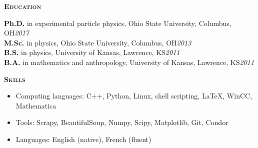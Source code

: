 \documentclass[line]{letter}
\begin{document}
{\vspace{3pt}\Large \textsc{\textbf{Education}}}%
\begin{addmargin}[1em]{1em}
{\bf \large Ph.D.} in experimental particle physics, Ohio State University, Columbus, OH\hfill {\large \it 2017}\vspace{1mm}\\
{\bf \large M.Sc.} in physics, Ohio State University, Columbus, OH\hfill {\large \it 2013}\vspace{1mm}\\
{\bf \large B.S.} in physics, University of Kansas, Lawrence, KS\hfill {\large \it 2011}\vspace{1mm}\\
{\bf \large B.A.} in mathematics and anthropology,  University of Kansas, Lawrence, KS\hfill {\large \it 2011}
\end{addmargin}

{\vspace{7pt}\Large  \textsc{\textbf{Skills}} }
\vspace{-2mm}
\begin{itemize}[leftmargin=5mm]%

\item Computing languages: C++, Python, Linux, shell scripting, \LaTeX, WinCC, Mathematica
\item Tools: Scrapy, BeautifulSoup, Numpy, Scipy, Matplotlib, Git, Condor
\item Languages: English (native), French (fluent)
\end{itemize}

\end{document}
